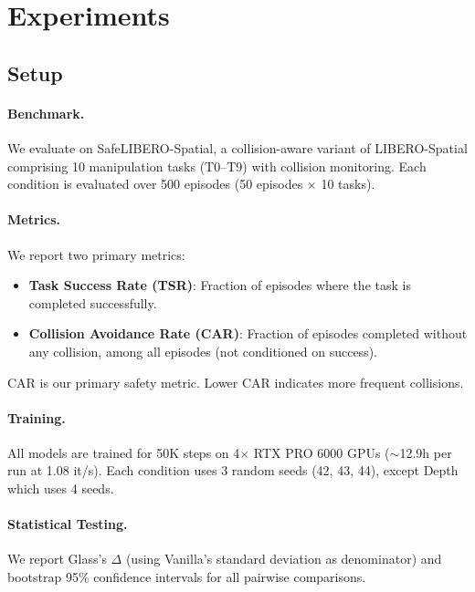 \documentclass[letterpaper]{article}
\begin{document}
\section{Experiments}
\label{sec:experiments}

\subsection{Setup}

\paragraph{Benchmark.}
We evaluate on SafeLIBERO-Spatial, a collision-aware variant of LIBERO-Spatial comprising 10 manipulation tasks (T0--T9) with collision monitoring.
Each condition is evaluated over 500 episodes (50 episodes $\times$ 10 tasks).

\paragraph{Metrics.}
We report two primary metrics:
\begin{itemize}
    \item \textbf{Task Success Rate (TSR)}: Fraction of episodes where the task is completed successfully.
    \item \textbf{Collision Avoidance Rate (CAR)}: Fraction of episodes completed without any collision, among all episodes (not conditioned on success).
\end{itemize}
CAR is our primary safety metric. Lower CAR indicates more frequent collisions.

\paragraph{Training.}
All models are trained for 50K steps on 4$\times$ RTX PRO 6000 GPUs ($\sim$12.9h per run at 1.08 it/s).
Each condition uses 3 random seeds (42, 43, 44), except Depth which uses 4 seeds.

\paragraph{Statistical Testing.}
We report Glass's $\Delta$ (using Vanilla's standard deviation as denominator) and bootstrap 95\% confidence intervals for all pairwise comparisons.
\end{document}
